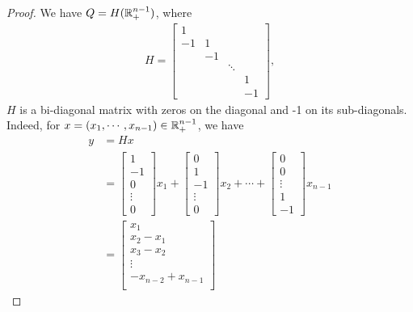 \documentclass[12pt]{article}
\begin{document}
    \begin{proof}
        We have $Q = H(\mathbb R^{n - 1}_+)$, where
        \begin{align}
            H =
            \begin{bmatrix}
                1 &  & &
                \\
                -1 & 1 & &
                \\
                 & -1 & &
                \\
                &  & \ddots&
                \\[-1em]
                &  & & 1
                \\
                &  && -1
            \end{bmatrix},
        \end{align}
        $H$ is a bi-diagonal matrix with zeros on the diagonal and -1 on its sub-diagonals. Indeed, for $x = (x_1, \cdots, x_{n - 1})\in \mathbb R^{n - 1}_+$, we have
        \begin{align}
            y &= H x
            \\
            &=
            \begin{bmatrix}
                1 \\ -1 \\ 0 \\ \vdots \\ 0
            \end{bmatrix}x_1 +
            \begin{bmatrix}
                0 \\ 1 \\ -1 \\ \vdots \\ 0
            \end{bmatrix}x_2 +
            \cdots
            +
            \begin{bmatrix}
                0 \\ 0 \\ \vdots \\ 1 \\ -1
            \end{bmatrix} x_{n - 1}
            \\
            &=
            \begin{bmatrix}
                x_1 \\ x_2 - x_1 \\ x_3 - x_2
                \\ \vdots
                \\-x_{n - 2} + x_{n - 1}\\

\end{bmatrix}
\end{align}
\end{proof}
\end{document}
